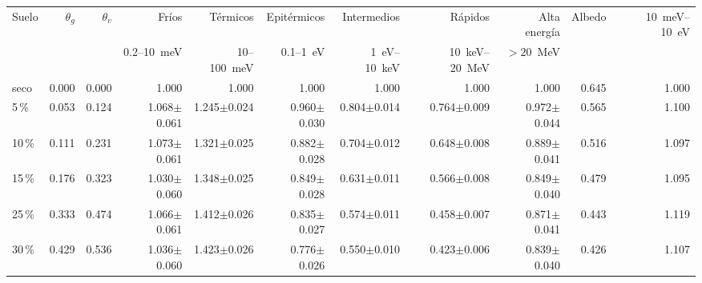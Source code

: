 \begin{tabular}{lrrrrrrrrrr}
\toprule
Suelo & $\theta_g$ & $\theta_v$ & Fríos & Térmicos & Epitérmicos & Intermedios & Rápidos & Alta energía & Albedo & 10~meV--10~eV \\
 & & & \scriptsize 0.2--10~meV & \scriptsize 10--100~meV & \scriptsize 0.1--1~eV & \scriptsize 1~eV--10~keV & \scriptsize 10~keV--20~MeV & \scriptsize $>20$~MeV & & \\
\midrule
seco & 0.000 & 0.000 & 1.000 & 1.000 & 1.000 & 1.000 & 1.000 & 1.000 & 0.645 & 1.000 \\
5\,\% & 0.053 & 0.124 & 1.068$\pm$0.061 & 1.245$\pm$0.024 & 0.960$\pm$0.030 & 0.804$\pm$0.014 & 0.764$\pm$0.009 & 0.972$\pm$0.044 & 0.565 & 1.100 \\
10\,\% & 0.111 & 0.231 & 1.073$\pm$0.061 & 1.321$\pm$0.025 & 0.882$\pm$0.028 & 0.704$\pm$0.012 & 0.648$\pm$0.008 & 0.889$\pm$0.041 & 0.516 & 1.097 \\
15\,\% & 0.176 & 0.323 & 1.030$\pm$0.060 & 1.348$\pm$0.025 & 0.849$\pm$0.028 & 0.631$\pm$0.011 & 0.566$\pm$0.008 & 0.849$\pm$0.040 & 0.479 & 1.095 \\
25\,\% & 0.333 & 0.474 & 1.066$\pm$0.061 & 1.412$\pm$0.026 & 0.835$\pm$0.027 & 0.574$\pm$0.011 & 0.458$\pm$0.007 & 0.871$\pm$0.041 & 0.443 & 1.119 \\
30\,\% & 0.429 & 0.536 & 1.036$\pm$0.060 & 1.423$\pm$0.026 & 0.776$\pm$0.026 & 0.550$\pm$0.010 & 0.423$\pm$0.006 & 0.839$\pm$0.040 & 0.426 & 1.107 \\
\bottomrule
\end{tabular}
